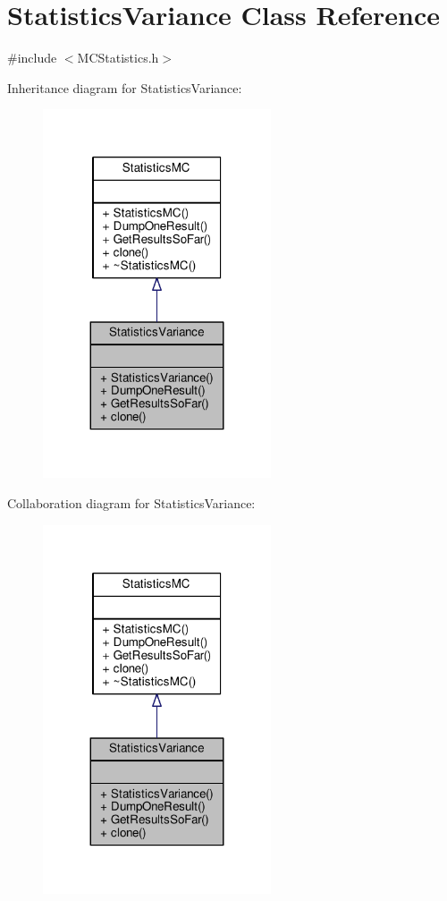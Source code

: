 \hypertarget{classStatisticsVariance}{}\section{Statistics\+Variance Class Reference}
\label{classStatisticsVariance}


{\ttfamily \#include $<$M\+C\+Statistics.\+h$>$}



Inheritance diagram for Statistics\+Variance\+:
\nopagebreak
\begin{figure}[H]
\begin{center}
\leavevmode
\includegraphics[width=191pt]{classStatisticsVariance__inherit__graph}
\end{center}
\end{figure}


Collaboration diagram for Statistics\+Variance\+:
\nopagebreak
\begin{figure}[H]
\begin{center}
\leavevmode
\includegraphics[width=191pt]{classStatisticsVariance__coll__graph}
\end{center}
\end{figure}
